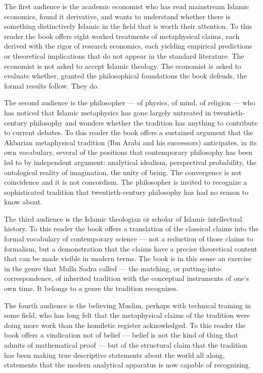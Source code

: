 The first audience is the academic economist who has read mainstream
Islamic economics, found it derivative, and wants to understand whether
there is something distinctively Islamic in the field that is worth
their attention. To this reader the book offers eight worked
treatments of metaphysical claims, each derived with the rigor of
research economics, each yielding empirical predictions or theoretical
implications that do not appear in the standard literature. The
economist is not asked to accept Islamic theology. The economist is
asked to evaluate whether, granted the philosophical foundations the
book defends, the formal results follow. They do.

The second audience is the philosopher --- of physics, of mind, of
religion --- who has noticed that Islamic metaphysics has gone largely
untreated in twentieth-century philosophy and wonders whether the
tradition has anything to contribute to current debates. To this
reader the book offers a sustained argument that the Akbarian
metaphysical tradition (Ibn Arabi and his successors) anticipates,
in its own vocabulary, several of the positions that contemporary
philosophy has been led to by independent argument: analytical
idealism, perspectival probability, the ontological reality of
imagination, the unity of being. The convergence is not coincidence
and it is not concordism. The philosopher is invited to recognize a
sophisticated tradition that twentieth-century philosophy has had no
reason to know about.

The third audience is the Islamic theologian or scholar of Islamic
intellectual history. To this reader the book offers a translation of
the classical claims into the formal vocabulary of contemporary
science --- not a reduction of those claims to formalism, but a
demonstration that the claims have a precise theoretical content that
can be made visible in modern terms. The book is in this sense an
exercise in the genre that Mulla Sadra called  --- the
matching, or putting-into-correspondence, of inherited tradition with
the conceptual instruments of one's own time. It belongs to a
genre the tradition recognizes.

The fourth audience is the believing Muslim, perhaps with technical
training in some field, who has long felt that the metaphysical
claims of the tradition were doing more work than the homiletic
register acknowledged. To this reader the book offers a vindication
not of belief --- belief is not the kind of thing that admits of
mathematical proof --- but of the structural claim that the
tradition has been making true descriptive statements about the world
all along, statements that the modern analytical apparatus is now
capable of recognizing.

